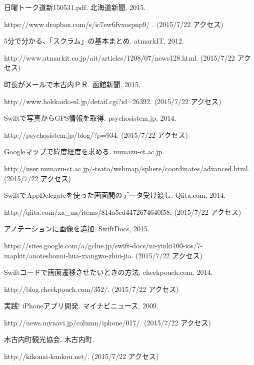 \documentclass[openany,11pt,papersize]{jsbook}
\begin{document}
\begin{thebibliography}{9}
日曜トーク道新150531.pdf. 北海道新聞, 2015.\par
https://www.dropbox.com/s/ic7ew6fvxospnp9/%
. (2015/7/22 アクセス)

5分で分かる、「スクラム」の基本まとめ. atmarkIT, 2012.\par
http://www.atmarkit.co.jp/ait/articles/1208/07/news128.html. (2015/7/22 アクセス)

町長がメールで木古内ＰＲ. 函館新聞, 2015.\par
http://www.hokkaido-nl.jp/detail.cgi?id=26392. (2015/7/22 アクセス)

Swiftで写真からGPS情報を取得. psychosistem.jp, 2014.\par
http://psychosistem.jp/blog/?p=934. (2015/7/22 アクセス)

\bibitem{}
Googleマップで緯度経度を求める. numazu-ct.ac.jp.\par
http://user.numazu-ct.ac.jp/-tsato/webmap/sphere/coordinates/advanced.html. (2015/7/22 アクセス)

\bibitem{}
SwiftでAppDelegateを使った画面間のデータ受け渡し. Qiita.com, 2014.\par 
http://qiita.com/xa\_un/items/814a5cd4472674640f58. (2015/7/22 アクセス)

\bibitem{}
アノテーションに画像を追加. SwiftDocs, 2015. \par
https://sites.google.com/a/gclue.jp/swift-docs/ni-yinki100-ios/7-mapkit/anoteshonni-hua-xiangwo-zhui-jia. (2015/7/22 アクセス)

\bibitem{}
Swiftコードで画面遷移させたいときの方法. cheekpouch.com, 2014.\par
http://blog.cheekpouch.com/352/. (2015/7/22 アクセス)

\bibitem{}
実践! iPhoneアプリ開発. マイナビニュース, 2009.\par
http://news.mynavi.jp/column/iphone/017/. (2015/7/22 アクセス)

\bibitem{}
木古内町観光協会. 木古内町.\par
http://kikonai-kankou.net/. (2015/7/22 アクセス)
\end{thebibliography}
\end{document}

